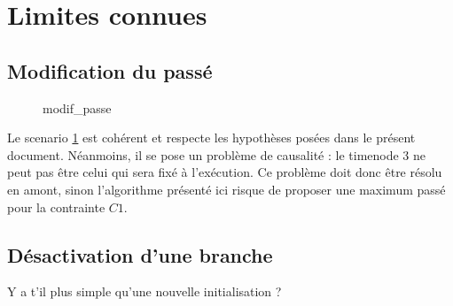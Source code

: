 \documentclass[10pt,a4paper]{article}
\begin{document}


\section{Limites connues}

	\subsection{Modification du passé}

	\begin{figure}[htp]
		\centering
		
		\schemaScenario modif_passe
		\caption{}
		\label{S:modif_passe}
	\end{figure}

Le scenario \ref{S:modif_passe} est cohérent et respecte les hypothèses posées dans le présent document. Néanmoins, il se pose un problème de causalité : le timenode 3 ne peut pas être celui qui sera fixé à l'exécution. Ce problème doit donc être résolu en amont, sinon l'algorithme présenté ici risque de proposer une maximum passé pour la contrainte $C1$.


	\subsection{Désactivation d'une branche}
Y a t'il plus simple qu'une nouvelle initialisation ?
\end{document}
